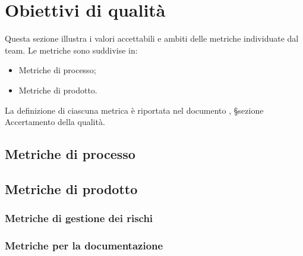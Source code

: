 \section{Obiettivi di qualità}

\par Questa sezione illustra i valori accettabili e ambiti delle metriche individuate dal team. Le metriche sono suddivise in:
\begin{itemize}
  \item Metriche di processo;
  \item Metriche di prodotto.
\end{itemize}

\par La definizione di ciascuna metrica è riportata nel documento \NormeDiProgetto, §sezione Accertamento della qualità.

\subsection{Metriche di processo}


\subsection{Metriche di prodotto}
%




\subsubsection{Metriche di gestione dei rischi}


\subsubsection{Metriche per la documentazione}

